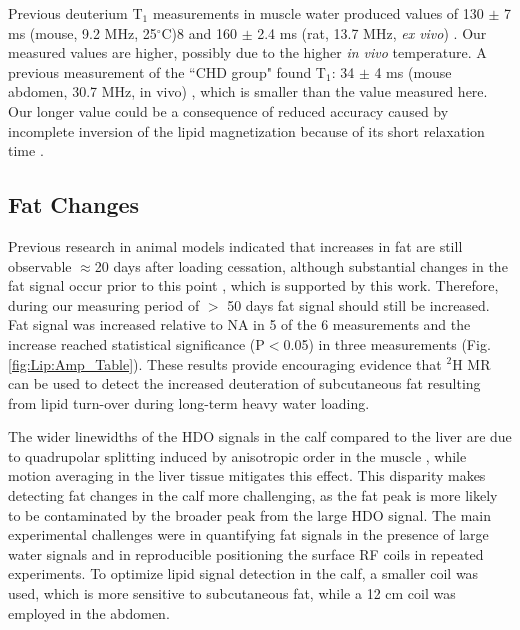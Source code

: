 Previous deuterium T$_1$ measurements in muscle water produced values of 130 $\pm$ 7 ms (mouse, 9.2 MHz, 25$^\circ$C)8 and 160 $\pm$ 2.4 ms (rat, 13.7 MHz, \textit{ex vivo}) \cite{Block1987COMMUNICATIONSTissues}. Our measured values are higher, possibly due to the higher \textit{in vivo} temperature. A previous measurement of the ``CHD group" found T$_1$: 34 $\pm$ 4 ms (mouse abdomen, 30.7 MHz, in vivo) \cite{Brereton1986PreliminarySpectroscopy}, which is smaller than the value measured here. Our longer value could be a consequence of reduced accuracy caused by incomplete inversion of the lipid magnetization because of its short relaxation time \cite{Pfaff2017PredictingPulses}.


\subsection{Fat Changes}


Previous research in animal models indicated that increases in fat are still observable $\approx$20 days after loading cessation, although substantial changes in the fat signal occur prior to this point \cite{Brereton1986PreliminarySpectroscopy}, which is supported by this work. Therefore, during our measuring period of $>$ 50 days fat signal should still be increased. Fat signal was increased relative to \ac{NA} in 5 of the 6 measurements and the increase reached statistical significance (P$<$0.05) in three measurements (Fig. \ref{fig:Lip:Amp_Table}). These results provide encouraging evidence that $^2$H MR can be used to detect the increased deuteration of subcutaneous fat resulting from lipid turn-over during long-term heavy water loading. 

The wider linewidths of the \ac{HDO} signals in the calf compared to the liver are due to quadrupolar splitting induced by anisotropic order in the muscle \cite{Gursan2022ResidualMuscle}, while motion averaging in the liver tissue mitigates this effect. This disparity makes detecting fat changes in the calf more challenging, as the fat peak is more likely to be contaminated by the broader peak from the large \ac{HDO} signal. The main experimental challenges were in quantifying fat signals in the presence of large water signals and in reproducible positioning the surface RF coils in repeated experiments. To optimize lipid signal detection in the calf, a smaller coil was used, which is more sensitive to subcutaneous fat, while a 12 cm coil was employed in the abdomen. 

